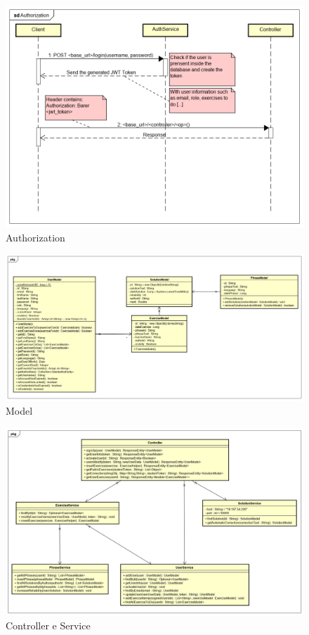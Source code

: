 \begin{figure}[H]
\centering
\includegraphics[width=17cm, keepaspectratio]{img/Authorization.png} 
\caption{Authorization}
\end{figure}

\begin{figure}[H]
\centering
\includegraphics[width=17cm, keepaspectratio]{img/model.png} 
\caption{Model}
\end{figure}


\begin{figure}[H]
\centering
\includegraphics[width=17cm, keepaspectratio]{img/Controller-service.png} 
\caption{Controller e Service}
\end{figure}


